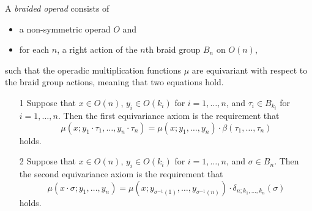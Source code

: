 \begin{Defi}\label{Defi:broperad}
A \textit{braided operad} consists of
  \begin{itemize}
    \item a non-symmetric operad $O$ and
    \item for each $n$, a right action of the $n$th braid group $B_{n}$ on $O(n)$,
  \end{itemize}
%  
such that the operadic multiplication functions $\mu$ are equivariant with respect to the braid group actions, meaning that two equations hold.
\begin{itemize}
\item[1] Suppose that $x \in O(n)$, $y_i \in O(k_i)$ for $i = 1, \ldots, n$, and $\tau_i \in B_{k_i}$ for  $i = 1, \ldots, n$. Then the first equivariance axiom is the requirement that
\[
\mu(x;y_1 \cdot \tau_1,\ldots,y_n \cdot \tau_n) = \mu(x;y_1,\ldots,y_n)\cdot \beta(\tau_1,\ldots,\tau_n)
\]
holds.%
\item[2] Suppose that  $x \in O(n)$, $y_i \in O(k_i)$ for $i = 1, \ldots, n$, and $\sigma \in B_{n}$. 
Then the second equivariance axiom is the requirement that
\[
 \mu(x \cdot \sigma; y_1, \ldots, y_n) = \mu\left(x;y_{\sigma^{-1}(1)},\ldots,y_{\sigma^{-1}(n)}\right)\cdot \delta_{n; k_1, \ldots, k_n}(\sigma)
\]
holds.%
\end{itemize}
\end{Defi}

